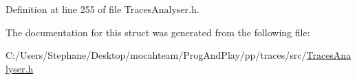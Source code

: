 Definition at line 255 of file Traces\+Analyser.\+h.



The documentation for this struct was generated from the following file\+:\begin{DoxyCompactItemize}
\item 
C\+:/\+Users/\+Stephane/\+Desktop/mocahteam/\+Prog\+And\+Play/pp/traces/src/\hyperlink{_traces_analyser_8h}{Traces\+Analyser.\+h}\end{DoxyCompactItemize}
